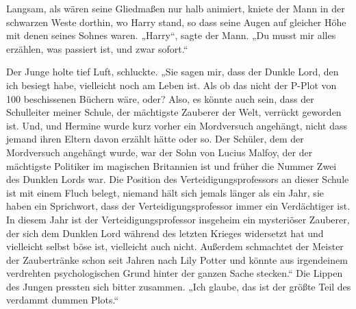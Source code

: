 Langsam, als wären seine Gliedmaßen nur halb animiert, kniete der Mann in der schwarzen Weste dorthin, wo Harry stand, so dass seine Augen auf gleicher Höhe mit denen seines Sohnes waren. „Harry“, sagte der Mann. „Du musst mir alles erzählen, was passiert ist, und zwar sofort.“

Der Junge holte tief Luft, schluckte.
„Sie sagen mir, dass der Dunkle Lord, den ich besiegt habe, vielleicht noch am Leben ist. Als ob das nicht der P-Plot von 100 beschissenen Büchern wäre, oder? Also, es könnte auch sein, dass der Schulleiter meiner Schule, der mächtigste Zauberer der Welt, verrückt geworden ist. Und, und Hermine wurde kurz vorher ein Mordversuch angehängt, nicht dass jemand ihren Eltern davon erzählt hätte oder so. Der Schüler, dem der Mordversuch angehängt wurde, war der Sohn von Lucius Malfoy, der der mächtigste Politiker im magischen Britannien ist und früher die Nummer Zwei des Dunklen Lords war. Die Position des Verteidigungsprofessors an dieser Schule ist mit einem Fluch belegt, niemand hält sich jemals länger als ein Jahr, sie haben ein Sprichwort, dass der Verteidigungsprofessor immer ein Verdächtiger ist. In diesem Jahr ist der Verteidigungsprofessor insgeheim ein mysteriöser Zauberer, der sich dem Dunklen Lord während des letzten Krieges widersetzt hat und vielleicht selbst böse ist, vielleicht auch nicht. Außerdem schmachtet der Meister der Zaubertränke schon seit Jahren nach Lily Potter und könnte aus irgendeinem verdrehten psychologischen Grund hinter der ganzen Sache stecken.“
Die Lippen des Jungen pressten sich bitter zusammen. „Ich glaube, das ist der größte Teil des verdammt dummen Plots.“


